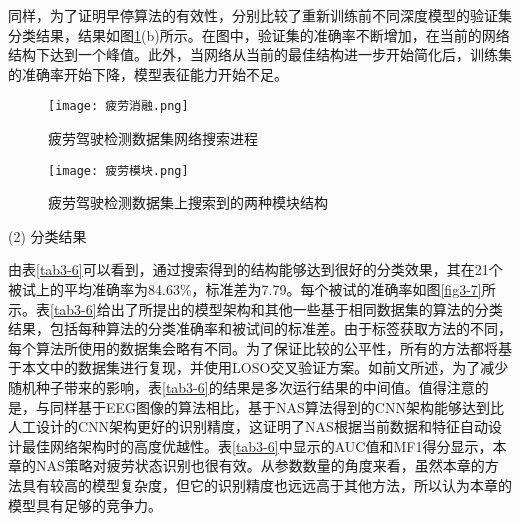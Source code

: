 同样，为了证明早停算法的有效性，分别比较了重新训练前不同深度模型的验证集分类结果，结果如图\ref{fig3-5}(b)所示。在图中，验证集的准确率不断增加，在当前的网络结构下达到一个峰值。此外，当网络从当前的最佳结构进一步开始简化后，训练集的准确率开始下降，模型表征能力开始不足。

\begin{figure}[!h]
	\centering
	\texttt{[image: 疲劳消融.png]}
	\caption{疲劳驾驶检测数据集网络搜索进程} 
	\label{fig3-5}
\end{figure}

\begin{figure}[!h]
	\centering
	\texttt{[image: 疲劳模块.png]}
	\caption{疲劳驾驶检测数据集上搜索到的两种模块结构} 
	\label{fig3-6}
\end{figure}


(2) 分类结果 

由表\ref{tab3-6}可以看到，通过搜索得到的结构能够达到很好的分类效果，其在21个被试上的平均准确率为84.63\%，标准差为7.79。每个被试的准确率如图\ref{fig3-7}所示。表\ref{tab3-6}给出了所提出的模型架构和其他一些基于相同数据集的算法的分类结果，包括每种算法的分类准确率和被试间的标准差。由于标签获取方法的不同，每个算法所使用的数据集会略有不同。为了保证比较的公平性，所有的方法都将基于本文中的数据集进行复现，并使用LOSO交叉验证方案。如前文所述，为了减少随机种子带来的影响，表\ref{tab3-6}的结果是多次运行结果的中间值。值得注意的是，与同样基于EEG图像的算法\cite{3-32}相比，基于NAS算法得到的CNN架构能够达到比人工设计的CNN架构更好的识别精度，这证明了NAS根据当前数据和特征自动设计最佳网络架构时的高度优越性。表\ref{tab3-6}中显示的AUC值和MF1得分显示，本章的NAS策略对疲劳状态识别也很有效。从参数数量的角度来看，虽然本章的方法具有较高的模型复杂度，但它的识别精度也远远高于其他方法，所以认为本章的模型具有足够的竞争力。

